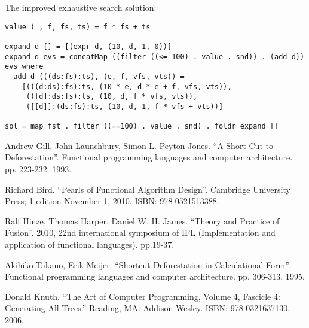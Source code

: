 \documentclass{article}
\begin{document}
The improved exhaustive search solution:

\begin{lstlisting}
value (_, f, fs, ts) = f * fs + ts

expand d [] = [(expr d, (10, d, 1, 0))]
expand d evs = concatMap ((filter ((<= 100) . value . snd)) . (add d)) evs where
  add d (((ds:fs):ts), (e, f, vfs, vts)) =
    [(((d:ds):fs):ts, (10 * e, d * e + f, vfs, vts)),
     (([d]:ds:fs):ts, (10, d, f * vfs, vts)),
     ([[d]]:(ds:fs):ts, (10, d, 1, f * vfs + vts))]

sol = map fst . filter ((==100) . value . snd) . foldr expand []
\end{lstlisting}

\ifx\wholebook\relax \else
\begin{thebibliography}{99}

Andrew Gill, John Launchbury, Simon L. Peyton Jones. ``A Short Cut to Deforestation''. Functional programming languages and computer architecture. pp. 223-232. 1993.

Richard Bird. ``Pearls of Functional Algorithm Design''. Cambridge University Press; 1 edition November 1, 2010. ISBN: 978-0521513388.

Ralf Hinze, Thomas Harper, Daniel W. H. James. ``Theory and Practice of Fusion''. 2010, 22nd international symposium of IFL (Implementation and application of functional languages). pp.19-37.

Akihiko Takano, Erik Meijer. ``Shortcut Deforestation in Calculational Form''. Functional programming languages and computer architecture. pp. 306-313. 1995.

Donald Knuth. ``The Art of Computer Programming, Volume 4, Fascicle 4: Generating All Trees.'' Reading, MA: Addison-Wesley. ISBN: 978-0321637130. 2006.

\end{thebibliography}

\expandafter\enddocument

\fi
\end{document}
